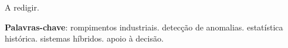 
\setlength{\absparsep}{18pt} %

\begin{resumo}

A redigir.

\textbf{Palavras-chave}: rompimentos industriais. detecção de anomalias. estatística histórica. sistemas híbridos. apoio à decisão.
\end{resumo}
